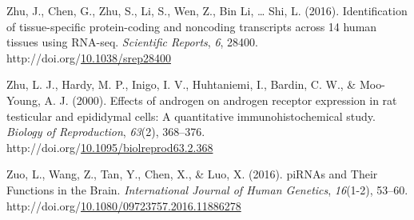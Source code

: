\documentclass[12pt,twoside]{reedthesis}
\newlength{\cslhangindent}
\newenvironment{CSLReferences}[2] %
 {%
  \setlength{\parindent}{0pt}
  \ifodd #1 \everypar{\setlength{\hangindent}{\cslhangindent}}\ignorespaces\fi
  \ifnum #2 > 0
  \setlength{\parskip}{#2\baselineskip}
  \fi
 }%
 {}
\begin{document}
\begin{CSLReferences}{1}{0}
\leavevmode{}%
Zhu, J., Chen, G., Zhu, S., Li, S., Wen, Z., Bin Li, \ldots{} Shi, L. (2016). Identification of tissue-specific protein-coding and noncoding transcripts across 14 human tissues using RNA-seq. \emph{Scientific Reports}, \emph{6}, 28400. http://doi.org/\href{https://doi.org/10.1038/srep28400}{10.1038/srep28400}

\leavevmode{}%
Zhu, L. J., Hardy, M. P., Inigo, I. V., Huhtaniemi, I., Bardin, C. W., \& Moo-Young, A. J. (2000). Effects of androgen on androgen receptor expression in rat testicular and epididymal cells: A quantitative immunohistochemical study. \emph{Biology of Reproduction}, \emph{63}(2), 368--376. http://doi.org/\href{https://doi.org/10.1095/biolreprod63.2.368}{10.1095/biolreprod63.2.368}

\leavevmode{}%
Zuo, L., Wang, Z., Tan, Y., Chen, X., \& Luo, X. (2016). piRNAs and Their Functions in the Brain. \emph{International Journal of Human Genetics}, \emph{16}(1-2), 53--60. http://doi.org/\href{https://doi.org/10.1080/09723757.2016.11886278}{10.1080/09723757.2016.11886278}

\end{CSLReferences}

\end{document}
